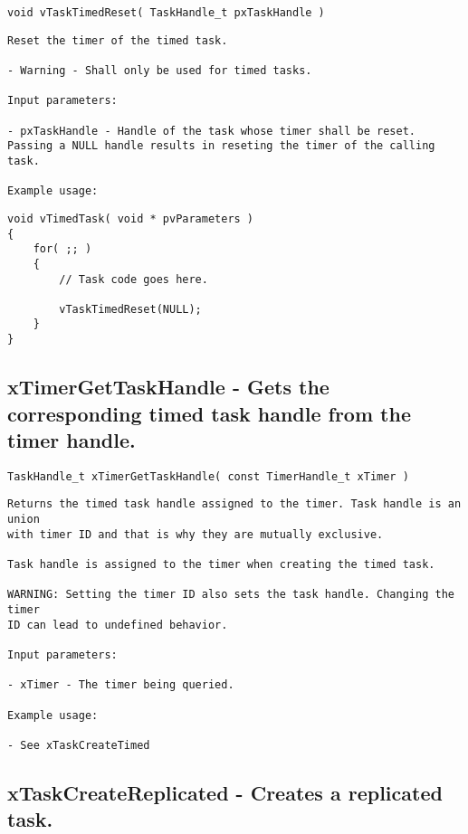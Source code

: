 \begin{verbatim}
void vTaskTimedReset( TaskHandle_t pxTaskHandle )
\end{verbatim}

\begin{lstlisting}
Reset the timer of the timed task.

- Warning - Shall only be used for timed tasks.

Input parameters:

- pxTaskHandle - Handle of the task whose timer shall be reset.
Passing a NULL handle results in reseting the timer of the calling task.

Example usage:
\end{lstlisting}

\begin{verbatim}
void vTimedTask( void * pvParameters )
{
    for( ;; )
    {
        // Task code goes here.

        vTaskTimedReset(NULL);
    }
}
\end{verbatim}

\subsection{xTimerGetTaskHandle -  Gets the corresponding timed task handle from the timer handle.}
\label{rt_cmd:xTimerGetTaskHandle}
\begin{verbatim}
TaskHandle_t xTimerGetTaskHandle( const TimerHandle_t xTimer )
\end{verbatim}
\begin{lstlisting}
Returns the timed task handle assigned to the timer. Task handle is an union
with timer ID and that is why they are mutually exclusive.

Task handle is assigned to the timer when creating the timed task.

WARNING: Setting the timer ID also sets the task handle. Changing the timer
ID can lead to undefined behavior.

Input parameters:

- xTimer - The timer being queried.

Example usage:

- See xTaskCreateTimed

\end{lstlisting}
\subsection{xTaskCreateReplicated -  Creates a replicated task.}
\label{rt_cmd:xTaskCreateReplicated}


